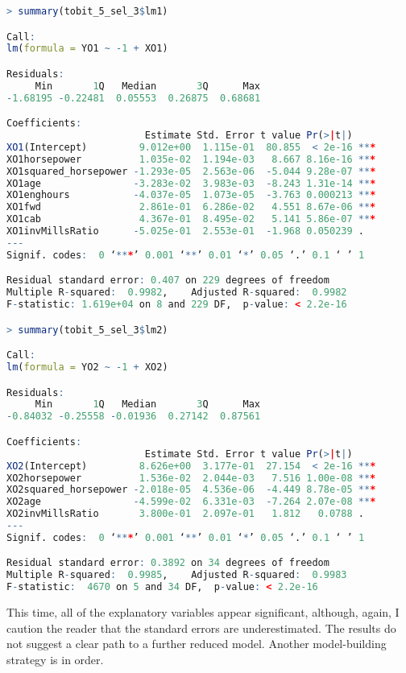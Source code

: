 \begin{lstlisting}[language=R]
> summary(tobit_5_sel_3$lm1)

Call:
lm(formula = YO1 ~ -1 + XO1)

Residuals:
     Min       1Q   Median       3Q      Max 
-1.68195 -0.22481  0.05553  0.26875  0.68681 

Coefficients:
                        Estimate Std. Error t value Pr(>|t|)    
XO1(Intercept)         9.012e+00  1.115e-01  80.855  < 2e-16 ***
XO1horsepower          1.035e-02  1.194e-03   8.667 8.16e-16 ***
XO1squared_horsepower -1.293e-05  2.563e-06  -5.044 9.28e-07 ***
XO1age                -3.283e-02  3.983e-03  -8.243 1.31e-14 ***
XO1enghours           -4.037e-05  1.073e-05  -3.763 0.000213 ***
XO1fwd                 2.861e-01  6.286e-02   4.551 8.67e-06 ***
XO1cab                 4.367e-01  8.495e-02   5.141 5.86e-07 ***
XO1invMillsRatio      -5.025e-01  2.553e-01  -1.968 0.050239 .  
---
Signif. codes:  0 ‘***’ 0.001 ‘**’ 0.01 ‘*’ 0.05 ‘.’ 0.1 ‘ ’ 1

Residual standard error: 0.407 on 229 degrees of freedom
Multiple R-squared:  0.9982,	Adjusted R-squared:  0.9982 
F-statistic: 1.619e+04 on 8 and 229 DF,  p-value: < 2.2e-16

> summary(tobit_5_sel_3$lm2)

Call:
lm(formula = YO2 ~ -1 + XO2)

Residuals:
     Min       1Q   Median       3Q      Max 
-0.84032 -0.25558 -0.01936  0.27142  0.87561 

Coefficients:
                        Estimate Std. Error t value Pr(>|t|)    
XO2(Intercept)         8.626e+00  3.177e-01  27.154  < 2e-16 ***
XO2horsepower          1.536e-02  2.044e-03   7.516 1.00e-08 ***
XO2squared_horsepower -2.018e-05  4.536e-06  -4.449 8.78e-05 ***
XO2age                -4.599e-02  6.331e-03  -7.264 2.07e-08 ***
XO2invMillsRatio       3.800e-01  2.097e-01   1.812   0.0788 .  
---
Signif. codes:  0 ‘***’ 0.001 ‘**’ 0.01 ‘*’ 0.05 ‘.’ 0.1 ‘ ’ 1

Residual standard error: 0.3892 on 34 degrees of freedom
Multiple R-squared:  0.9985,	Adjusted R-squared:  0.9983 
F-statistic:  4670 on 5 and 34 DF,  p-value: < 2.2e-16
\end{lstlisting}

This time, all of the explanatory variables appear significant, 
although, again, I caution the reader that the standard errors are underestimated. 
The results do not suggest a clear path to a further reduced model. 
Another model-building strategy is in order. 

